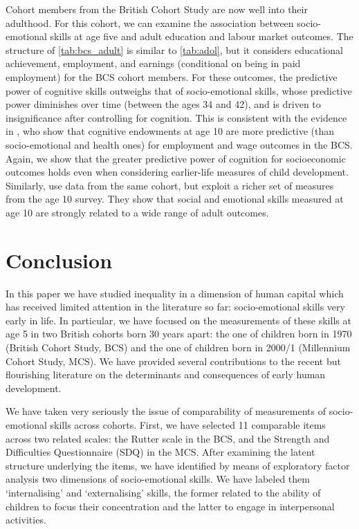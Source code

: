Cohort members from the British Cohort Study are now well into their adulthood. For this cohort, we can examine the association between socio-emotional skills at age five and adult education and labour market outcomes. The structure of \autoref{tab:bcs_adult} is similar to \autoref{tab:adol}, but it considers educational achievement, employment, and earnings (conditional on being in paid employment) for the BCS cohort members. For these outcomes, the predictive power of cognitive skills outweighs that of socio-emotional skills, whose predictive power diminishes over time (between the ages 34 and 42), and is driven to insignificance after controlling for cognition. This is consistent with the evidence in  \citet{Conti2011}, who show that cognitive endowments at age 10 are more predictive (than socio-emotional and health ones) for employment and wage outcomes in the BCS. Again, we show that the greater predictive power of cognition for socioeconomic outcomes holds even when considering earlier-life measures of child development. Similarly, \citet{Goodman2015} use data from the same cohort, but exploit a richer set of measures from the age 10 survey. They show that social and emotional skills measured at age 10 are strongly related to a wide range of adult outcomes.

\section{Conclusion}\label{sec:conclusions}

In this paper we have studied inequality in a dimension of human capital which has received limited attention in the literature so far: socio-emotional skills very early in life. In particular, we have focused on the measurements of these skills at age 5 in two British cohorts born 30 years apart: the one of children born in 1970 (British Cohort Study, BCS) and the one of children born in 2000/1 (Millennium Cohort Study, MCS). We have provided several contributions to the recent but flourishing literature on the determinants and consequences of early human development.

We have taken very seriously the issue of comparability of measurements of socio-emotional skills across cohorts. First, we have selected 11 comparable items across two related scales: the Rutter scale in the BCS, and the Strength and Difficulties Questionnaire (SDQ) in the MCS. After examining the latent structure underlying the items, we have identified by means of exploratory factor analysis two dimensions of socio-emotional skills. We have labeled them `internalising' and `externalising' skills, the former related to the ability of children to focus their concentration and the latter to engage in interpersonal activities.

